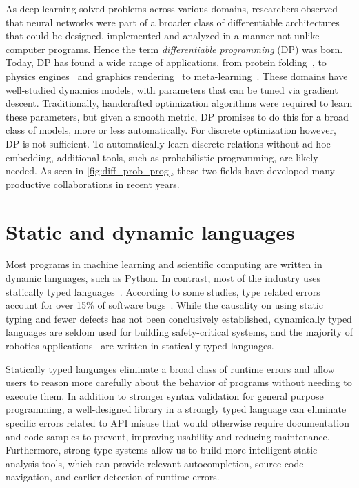 \documentclass[12pt,initial,twoside,maitrise]{dms}
\numberwithin{equation}{section}
\numberwithin{table}{chapter}
\numberwithin{figure}{chapter}
\begin{document}
As deep learning solved problems across various domains, researchers observed that neural networks were part of a broader class of differentiable architectures that could be designed, implemented and analyzed in a manner not unlike computer programs. Hence the term \textit{differentiable programming} (DP) was born. Today, DP has found a wide range of applications, from protein folding~\citep{alquraishi2018end}, to physics engines~\citep{de2018end,DBLP:journals_corr_DegraveHDW16} and graphics rendering~\citep{loper2014opendr} to meta-learning~\citep{liu2018darts}. These domains have well-studied dynamics models, with parameters that can be tuned via gradient descent. Traditionally, handcrafted optimization algorithms were required to learn these parameters, but given a smooth metric, DP promises to do this for a broad class of models, more or less automatically. For discrete optimization however, DP is not sufficient. To automatically learn discrete relations without ad hoc embedding, additional tools, such as probabilistic programming, are likely needed. As seen in \autoref{fig:diff_prob_prog}, these two fields have developed many productive collaborations in recent years.

\section{Static and dynamic languages}

Most programs in machine learning and scientific computing are written in dynamic languages, such as Python. In contrast, most of the industry uses statically typed languages~\citep{github}. According to some studies, type related errors account for over 15\% of software bugs~\citep{gao2017type}. While the causality on using static typing and fewer defects has not been conclusively established, dynamically typed languages are seldom used for building safety-critical systems, and the majority of robotics applications~\citep{Areserio54:online} are written in statically typed languages.

Statically typed languages eliminate a broad class of runtime errors and allow users to reason more carefully about the behavior of programs without needing to execute them. In addition to stronger syntax validation for general purpose programming, a well-designed library in a strongly typed language can eliminate specific errors related to API misuse that would otherwise require documentation and code samples to prevent, improving usability and reducing maintenance. Furthermore, strong type systems allow us to build more intelligent static analysis tools, which can provide relevant autocompletion, source code navigation, and earlier detection of runtime errors.
\end{document}
